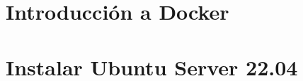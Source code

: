 \documentclass{\ClassPath/yukibook}
\begin{document}
    \part{Introducción a Docker}
    \graphicspath{{../../otros/Docker/}}
    

    \part{Instalar Ubuntu  Server 22.04}
    \graphicspath{{../../anexos/instalar_ubuntu_lts/img/}}
    

    \graphicspath{{../../temas_comunes/administracion_remota/img/}}
    
\end{document}
